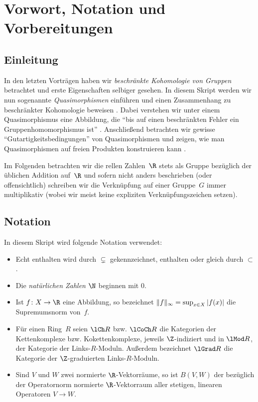 
\chapter{Vorwort, Notation und Vorbereitungen}
\section{Einleitung}
In den letzten Vorträgen haben wir \emph{beschränkte Kohomologie von Gruppen}
betrachtet und erste Eigenschaften selbiger gesehen. In diesem Skript werden
wir nun sogenannte \emph{Quasimorphismen} einführen und einen Zusammenhang zu
beschränkter Kohomologie beweisen . Dabei verstehen wir unter
einem Quasimorphismus eine Abbildung, die \enquote{bis auf einen beschränkten
Fehler ein Gruppenhomomorphismus ist} . Anschließend betrachten wir
gewisse \enquote{Gutartigkeitsbedingungen} von Quasimorphismen 
und zeigen, wie man Quasimorphismen auf freien Produkten konstruieren kann
.

Im Folgenden betrachten wir die rellen Zahlen~$\R$ stets als Gruppe bezüglich
der üblichen Addition auf~$\R$ und sofern nicht anders beschrieben (oder
offensichtlich) schreiben wir die Verknüpfung auf einer Gruppe~$G$ immer
multiplikativ (wobei wir meist keine expliziten Verknüpfungszeichen setzen).

\section{Notation}
In diesem Skript wird folgende Notation verwendet:
\begin{itemize}
    \item
        Echt enthalten wird durch $\subsetneq$ gekennzeichnet,
        enthalten oder gleich durch $\subset$.
    
    \item
        Die \emph{natürlichen Zahlen $\N$} beginnen mit $0$.

    \item
        Ist $f\colon X\to\R$ eine Abbildung, so bezeichnet
        $\lVert f\rVert_\infty = \sup_{x\in X}\,\lvert f(x)\rvert$ die
        Supremumsnorm von~$f$.

    \item
        Für einen Ring~$R$ seien $\lCh R$ bzw. $\lCoCh R$
        die Kategorien der Kettenkomplexe bzw. Kokettenkomplexe, jeweils
        $\Z$-indiziert und in $\lMod R$, der Kategorie der Links-$R$-Moduln.
        Außerdem bezeichnet $\lGrad R$ die Kategorie der $\Z$-graduierten
        Links-$R$-Moduln.

    \item
        Sind $V$ und $W$ zwei normierte $\R$-Vektorräume, so ist
        $B(V,W)$ der bezüglich der Operatornorm normierte $\R$-Vektorraum
        aller stetigen, linearen Operatoren $V\to W$.
\end{itemize}

